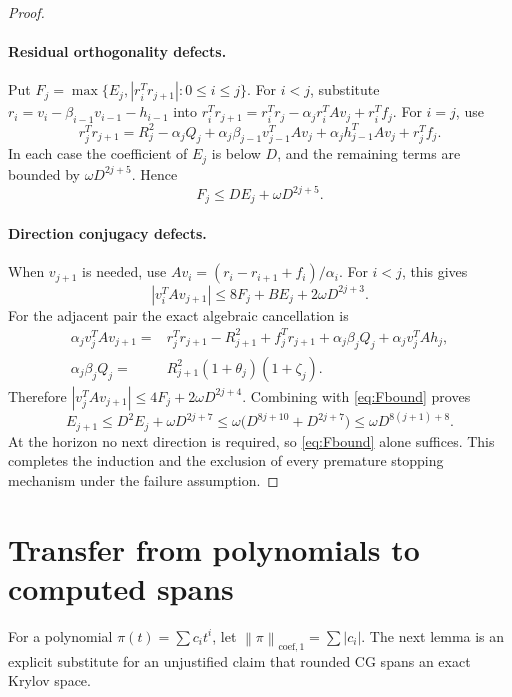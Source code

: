 \documentclass[11pt]{article}
\theoremstyle{remark}\newtheorem{remark}[theorem]{Remark}
\newcommand{\coefnorm}[1]{\left\lVert#1\right\rVert_{\mathrm{coef},1}}
\begin{document}
\begin{proof}
\paragraph{Residual orthogonality defects.}
Put
$F_j=\max\{E_j,|r_i^Tr_{j+1}|:0\le i\le j\}$.
For $i<j$, substitute
$r_i=v_i-\beta_{i-1}v_{i-1}-h_{i-1}$ into
$r_i^Tr_{j+1}=r_i^Tr_j-\alpha_jr_i^TAv_j+r_i^Tf_j$.
For $i=j$, use
\[
r_j^Tr_{j+1}=R_j^2-\alpha_jQ_j+
\alpha_j\beta_{j-1}v_{j-1}^TAv_j+
\alpha_jh_{j-1}^TAv_j+r_j^Tf_j.
\]
In each case the coefficient of $E_j$ is below $D$, and the remaining
terms are bounded by $\omega D^{2j+5}$. Hence
\begin{equation}\label{eq:Fbound}
F_j\le D E_j+\omega D^{2j+5}.
\end{equation}

\paragraph{Direction conjugacy defects.}
When $v_{j+1}$ is needed, use
$Av_i=(r_i-r_{i+1}+f_i)/\alpha_i$. For $i<j$, this gives
\[
|v_i^TAv_{j+1}|\le8F_j+B E_j+2\omega D^{2j+3}.
\]
For the adjacent pair the exact algebraic cancellation is
\begin{align*}
\alpha_jv_j^TAv_{j+1}
={}&r_j^Tr_{j+1}-R_{j+1}^2+f_j^Tr_{j+1}
+\alpha_j\beta_jQ_j+\alpha_jv_j^TAh_j,\\
\alpha_j\beta_jQ_j
={}&R_{j+1}^2(1+\theta_j)(1+\zeta_j).
\end{align*}
Therefore
$|v_j^TAv_{j+1}|\le4F_j+2\omega D^{2j+4}$.
Combining with \eqref{eq:Fbound} proves
\[
E_{j+1}\le D^2E_j+\omega D^{2j+7}
\le\omega\bigl(D^{8j+10}+D^{2j+7}\bigr)
\le\omega D^{8(j+1)+8}.
\]
At the horizon no next direction is required, so \eqref{eq:Fbound}
alone suffices. This completes the induction and the exclusion of every
premature stopping mechanism under the failure assumption.
\end{proof}

\section{Transfer from polynomials to computed spans}
\label{sec:span}

For a polynomial $\pi(t)=\sum c_it^i$, let
$\coefnorm{\pi}=\sum|c_i|$. The next lemma is an explicit substitute for
an unjustified claim that rounded CG spans an exact Krylov space.
\end{document}
